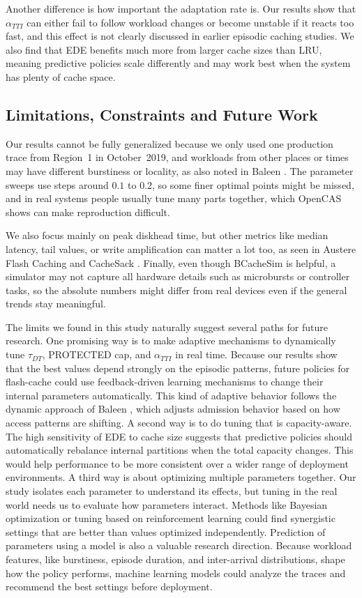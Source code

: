 \documentclass[sigconf]{acmart}
\begin{document}
Another difference is how important the adaptation rate is. Our results show that $\alpha_{TTI}$ can either fail to follow workload changes or become unstable if it reacts too fast, and this effect is not clearly discussed in earlier episodic caching studies. We also find that EDE benefits much more from larger cache sizes than LRU, meaning predictive policies scale differently and may work best when the system has plenty of cache space.

\subsection{Limitations, Constraints and Future Work}
Our results cannot be fully generalized because we only used one production trace from Region~1 in October~2019, and workloads from other places or times may have different burstiness or locality, as also noted in Baleen \cite{wong2024baleen}. The parameter sweeps use steps around $0.1$ to $0.2$, so some finer optimal points might be missed, and in real systems people usually tune many parts together, which OpenCAS \cite{Duan2025CrashConsistency} shows can make reproduction difficult.

We also focus mainly on peak disk\text{-}head time, but other metrics like median latency, tail values, or write amplification can matter a lot too, as seen in Austere Flash Caching \cite{Wang2020AustereCache} and CacheSack \cite{Yang2022CacheSack}. Finally, even though BCacheSim is helpful, a simulator may not capture all hardware details such as micro\text{-}bursts or controller tasks, so the absolute numbers might differ from real devices even if the general trends stay meaningful.

The limits we found in this study naturally suggest several paths for future research. One promising way is to make adaptive mechanisms to dynamically tune $\tau_{DT}$, PROTECTED cap, and $\alpha_{TTI}$ in real time. Because our results show that the best values depend strongly on the episodic patterns, future policies for flash-cache could use feedback-driven learning mechanisms to change their internal parameters automatically. This kind of adaptive behavior follows the dynamic approach of Baleen \cite{wong2024baleen}, which adjusts admission behavior based on how access patterns are shifting. A second way is to do tuning that is capacity-aware. The high sensitivity of EDE to cache size suggests that predictive policies should automatically rebalance internal partitions when the total capacity changes. This would help performance to be more consistent over a wider range of deployment environments. A third way is about optimizing multiple parameters together. Our study isolates each parameter to understand its effects, but tuning in the real world needs us to evaluate how parameters interact. Methods like Bayesian optimization or tuning based on reinforcement learning could find synergistic settings that are better than values optimized independently. Prediction of parameters using a model is also a valuable research direction. Because workload features, like burstiness, episode duration, and inter-arrival distributions, shape how the policy performs, machine learning models could analyze the traces and recommend the best settings before deployment.
\end{document}
